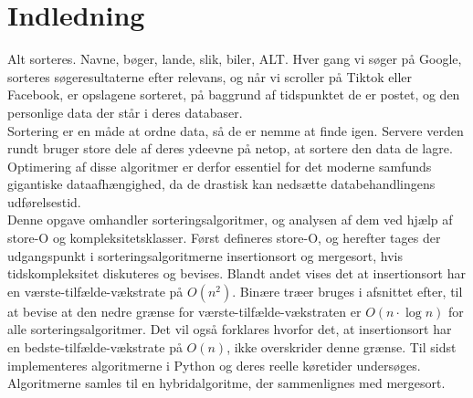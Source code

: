 \chapter*{Indledning}
\label{ch:Indledning}

Alt sorteres. Navne, bøger, lande, slik, biler, ALT. Hver gang vi søger på Google, sorteres søgeresultaterne efter relevans, og når vi scroller på Tiktok eller Facebook, er opslagene sorteret, på baggrund af tidspunktet de er postet, og den personlige data der står i deres databaser.\\

Sortering er en måde at ordne data, så de er nemme at finde igen. Servere verden rundt bruger store dele af deres ydeevne på netop, at sortere den data de lagre. Optimering af disse algoritmer er derfor essentiel for det moderne samfunds gigantiske dataafhængighed, da de drastisk kan nedsætte databehandlingens udførelsestid.\\

Denne opgave omhandler sorteringsalgoritmer, og analysen af dem ved hjælp af store-O og kompleksitetsklasser. Først defineres store-O, og herefter tages der udgangspunkt i sorteringsalgoritmerne insertionsort og mergesort, hvis tidskompleksitet diskuteres og bevises. Blandt andet vises det at insertionsort har en værste-tilfælde-vækstrate på $O(n^2)$. Binære træer bruges i afsnittet efter, til at bevise at den nedre grænse for værste-tilfælde-vækstraten er $O(n \cdot \log n)$ for alle sorteringsalgoritmer. Det vil også forklares hvorfor det, at insertionsort har en bedste-tilfælde-vækstrate på $O(n)$, ikke overskrider denne grænse. Til sidst implementeres algoritmerne i Python og deres reelle køretider undersøges. Algoritmerne samles til en hybridalgoritme, der sammenlignes med mergesort.
